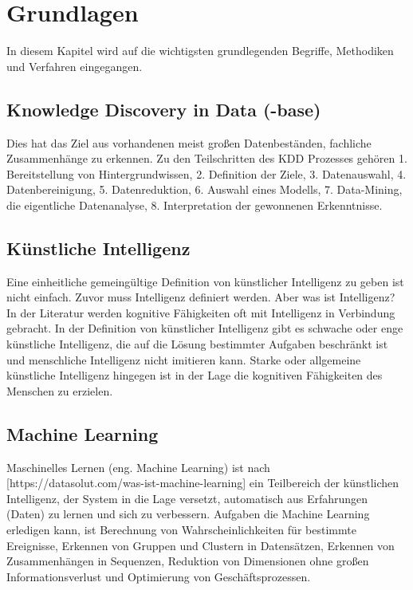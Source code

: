 \chapter{Grundlagen}
In diesem Kapitel wird auf die wichtigsten grundlegenden Begriffe, Methodiken und Verfahren eingegangen.

\section{Knowledge Discovery in Data (-base)}
Dies hat das Ziel aus vorhandenen meist großen Datenbeständen, fachliche Zusammenhänge zu erkennen. Zu den Teilschritten des KDD Prozesses gehören 1. Bereitstellung von Hintergrundwissen, 2. Definition der Ziele, 3. Datenauswahl, 4. Datenbereinigung, 5. Datenreduktion, 6. Auswahl eines Modells, 7. Data-Mining, die eigentliche Datenanalyse, 8. Interpretation der gewonnenen Erkenntnisse.\vspace{0.5cm}

\section{Künstliche Intelligenz}
Eine einheitliche gemeingültige Definition von künstlicher Intelligenz zu geben ist nicht einfach. Zuvor muss Intelligenz definiert werden. Aber was ist Intelligenz? In der Literatur werden kognitive Fähigkeiten oft mit Intelligenz in Verbindung gebracht.
In der Definition von künstlicher Intelligenz gibt es schwache oder enge künstliche Intelligenz, die auf die Lösung bestimmter Aufgaben beschränkt ist und menschliche Intelligenz nicht imitieren kann. Starke oder allgemeine künstliche Intelligenz hingegen ist in der Lage die kognitiven Fähigkeiten des Menschen zu erzielen.\vspace{0.2cm}



\section{Machine Learning}
Maschinelles Lernen (eng. Machine Learning) ist nach [https://datasolut.com/was-ist-machine-learning] ein Teilbereich der künstlichen Intelligenz, der System in die Lage versetzt, automatisch aus Erfahrungen (Daten) zu lernen und sich zu verbessern. Aufgaben die Machine Learning erledigen kann, ist Berechnung von Wahrscheinlichkeiten für bestimmte Ereignisse, Erkennen von Gruppen und Clustern in Datensätzen, Erkennen von Zusammenhängen in Sequenzen, Reduktion von Dimensionen ohne großen Informationsverlust und Optimierung von Geschäftsprozessen.\vspace{0.5cm}

